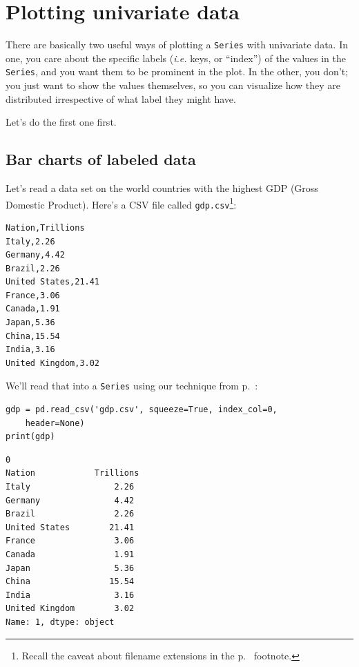 \section{Plotting univariate data}

\label{twoWaysToPlotUnivariateData}

There are basically two useful ways of plotting a \texttt{Series} with
univariate data. In one, you care about the specific labels (\textit{i.e.}
keys, or ``index'') of the values in the \texttt{Series}, and you want them to
be prominent in the plot. In the other, you don't; you just want to show the
values themselves, so you can visualize how they are distributed irrespective
of what label they might have.

Let's do the first one first.

\subsection{Bar charts of labeled data}


Let's read a data set on the world countries with the highest GDP (Gross
Domestic Product). Here's a CSV file called \texttt{gdp.csv}\footnote{Recall
the caveat about filename extensions in the p.~\pageref{extensions} footnote.}:

\begin{Verbatim}[fontsize=\small,samepage=true,frame=single,framesep=3mm]
Nation,Trillions
Italy,2.26
Germany,4.42
Brazil,2.26
United States,21.41
France,3.06
Canada,1.91
Japan,5.36
China,15.54
India,3.16
United Kingdom,3.02
\end{Verbatim}


We'll read that into a \texttt{Series} using our technique from
p.~\pageref{read_csv}:

\begin{Verbatim}[fontsize=\small,samepage=true,frame=single,framesep=3mm]
gdp = pd.read_csv('gdp.csv', squeeze=True, index_col=0,
    header=None)
print(gdp)
\end{Verbatim}
\vspace{-.3in}

\begin{Verbatim}[fontsize=\small,samepage=true,frame=leftline,framesep=5mm,framerule=1mm]
0
Nation            Trillions
Italy                 2.26
Germany               4.42
Brazil                2.26
United States        21.41
France                3.06
Canada                1.91
Japan                 5.36
China                15.54
India                 3.16
United Kingdom        3.02
Name: 1, dtype: object
\end{Verbatim}

